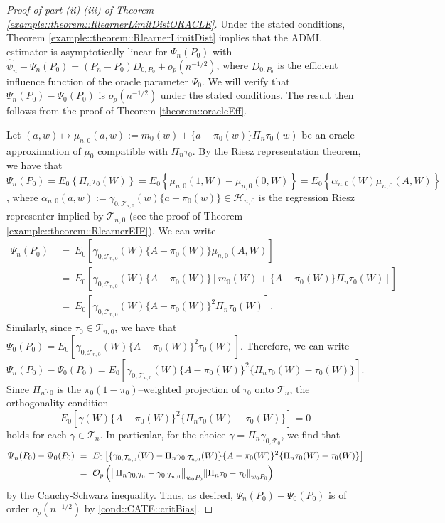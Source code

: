 \documentclass[11pt]{article}
\theoremstyle{definition}
\begin{document}
 \begin{proof}[Proof of part (ii)-(iii) of Theorem   \ref{example::theorem::RlearnerLimitDistORACLE}]
     
Under the stated conditions, Theorem \ref{example::theorem::RlearnerLimitDist} implies that the ADML estimator is asymptotically linear for $\Psi_n(P_0)$ with $\widehat{\psi}_n - \Psi_n(P_0) = (P_n - P_0)D_{0,P_0} + o_p(n^{-1/2})$, where $D_{0,P_0}$ is the efficient influence function of the oracle parameter $\Psi_0$. We will verify  that $\Psi_n(P_0) - \Psi_0(P_0)$ is $o_p(n^{-1/2})$ under the stated conditions. The result then follows from the proof of Theorem \ref{theorem::oracleEff}. 

 
 Let $(a,w) \mapsto \mu_{n,0}(a,w) := m_0(w) + \{a - \pi_0(w)\}\Pi_n \tau_0(w)$ be an oracle approximation of $\mu_0$ compatible with $\Pi_n \tau_0$. By the Riesz representation theorem, we have that $\Psi_n(P_0)=E_0\left\{\Pi_n \tau_0(W)\right\}=E_0\left\{\mu_{n,0}(1,W) - \mu_{n,0}(0,W)\right\}=E_0\left\{\alpha_{n,0}(W) \mu_{n,0}(A,W)\right\}$,
where $\alpha_{n,0}(a,w) := \gamma_{0, \mathcal{T}_{n,0}}(w)\{a - \pi_0(w)\} \in \mathcal{H}_{n,0}$ is the regression Riesz representer implied by $\mathcal{T}_{n,0}$ (see the proof of Theorem \ref{example::theorem::RlearnerEIF}). We can write
\begin{align*}
    \Psi_n(P_0)\ &=\ E_0\left[\gamma_{0, \mathcal{T}_{n,0}}(W)\{A - \pi_0(W)\}\mu_{n,0}(A,W)\right] \\
    &=\  E_0\left[\gamma_{0, \mathcal{T}_{n,0}}(W)\{A - \pi_0(W)\}[m_0(W) + \{A - \pi_0(W)\}\Pi_n \tau_0(W)]\right]\\
    & =\  E_0\left[\gamma_{0, \mathcal{T}_{n,0}}(W)\{A - \pi_0(W)\}^2 \Pi_n \tau_0(W)\right].
\end{align*}
Similarly, since $\tau_0 \in \mathcal{T}_{n,0}$, we have that $ \Psi_0(P_0) =E_0\left[\gamma_{0, \mathcal{T}_{n,0}}(W)\{A - \pi_0(W)\}^2 \tau_{0}(W)\right] $. Therefore, we can write 
$\Psi_n(P_0) - \Psi_0(P_0)  =   E_0\left[\gamma_{0, \mathcal{T}_{n,0}}(W)\{A - \pi_0(W)\}^2 \{\Pi_n \tau_0(W) - \tau_0(W)\}\right]$.
Since $\Pi_n \tau_0$ is the $\pi_0(1-\pi_0)$--weighted projection of $\tau_0$ onto $\mathcal{T}_n$, the orthogonality condition \[E_0\left[\gamma(W)\{A - \pi_0(W)\}^2 \{\Pi_n \tau_0(W) - \tau_0(W)\}\right] = 0\] holds for each $\gamma \in \mathcal{T}_n$. In particular, for the choice $\gamma = \Pi_n \gamma_{0, \mathcal{T}_0} $, we find that
\begin{align*}
    \Psi_n(P_0) - \Psi_0(P_0)\ &=\ E_0\left[\{\gamma_{0, \mathcal{T}_{n,0}}(W) - \Pi_n \gamma_{0, \mathcal{T}_{n,0}} (W)\}\{A - \pi_0(W)\}^2 \{\Pi_n \tau_0(W) - \tau_0(W)\}\right]\\
    &=\ \mathcal{O}_p\left(\norm{\Pi_n \gamma_{0, \mathcal{T}_0}  - \gamma_{0, \mathcal{T}_{n,0}}}_{w_0P_0}\norm{\Pi_n \tau_0 - \tau_0}_{w_0P_0}\right)
\end{align*}
by the Cauchy-Schwarz inequality. Thus, as desired, $\Psi_n(P_0)-\Psi_0(P_0)$ is of order $o_p(n^{-1/2})$ by \ref{cond::CATE::critBias}.


\end{proof}
\end{document}
